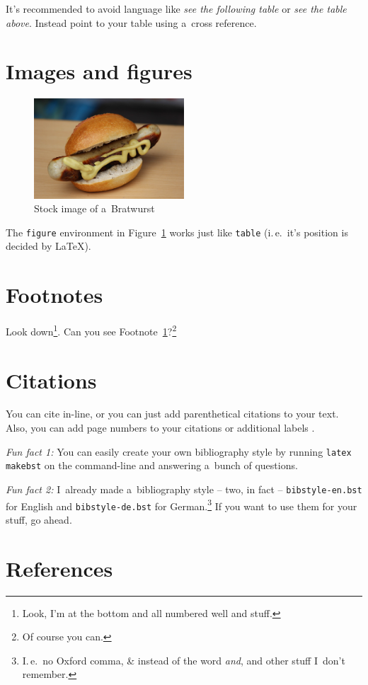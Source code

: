 \documentclass{scrartcl}
\begin{document}
It's recommended to avoid language like \emph{see the following table} or
\emph{see the table above}.
Instead point to your table using a~cross reference.

\section{Images and figures}

\begin{figure}[h]
  \centering%
  \includegraphics[width=0.5\textwidth]{images/bratwurst.jpg}
  \caption{Stock image of a~Bratwurst}
  \label{fig:wurst}
\end{figure}

The \texttt{figure} environment in Figure~\ref{fig:wurst} works just like
\texttt{table} (i.\,e.\ it's position is decided by \LaTeX).

\section{Footnotes}

Look down\footnote{
  \label{fn:my-footnote}
  Look, I'm at the bottom and all numbered well and stuff.
}.
Can you see Footnote~\ref{fn:my-footnote}?\footnote{
  Of course you can.
}

\section{Citations}

You can cite \citet{smith:2023} in-line, or you can just add parenthetical
citations \citep{muellerlapinsky:1986} to your text.
Also, you can add page numbers to your citations \citep[13--14]{actonetal:1997}
or additional labels \citep[cf.][54]{glargh:2030}.

\emph{Fun fact 1:}
You can easily create your own bibliography style by running \texttt{latex
makebst} on the command-line and answering a~bunch of questions.

\emph{Fun fact 2:}
I~already made a~bibliography style -- two, in fact -- \texttt{bibstyle-en.bst}
for English and \texttt{bibstyle-de.bst} for German.\footnote{%
  I.\,e.\ no Oxford comma, \& instead of the word \emph{and}, and other stuff
  I~don't remember.
}
If you want to use them for your stuff, go ahead.

\section{References}

\end{document}
